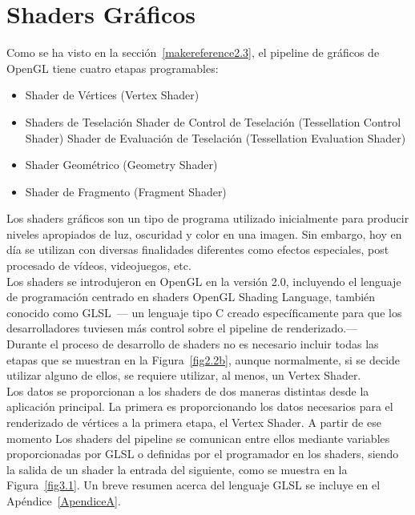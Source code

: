 \cleardoublepage

\chapter{Shaders Gráficos}
\label{makereference3}

Como se ha visto en la sección~\ref{makereference2.3}, el pipeline de gráficos
de OpenGL tiene cuatro etapas programables:

\begin{itemize}
		\item Shader de Vértices (Vertex Shader)
		\item Shaders de Teselación
				\subitem Shader de Control de Teselación (Tessellation Control
				Shader)
				\subitem Shader de Evaluación de Teselación (Tessellation
				Evaluation Shader)
		\item Shader Geométrico (Geometry Shader)
		\item Shader de Fragmento (Fragment Shader)
\end{itemize}

Los shaders gráficos son un tipo de programa utilizado inicialmente para
producir niveles apropiados de luz, oscuridad y color en una imagen. Sin
embargo, hoy en día se utilizan con diversas finalidades diferentes como efectos
especiales, post procesado de vídeos, videojuegos, etc.\\

Los shaders se introdujeron en OpenGL en la versión 2.0, incluyendo el lenguaje
de programación centrado en shaders OpenGL Shading Language, también conocido
como GLSL~\cite{GLSL}--- un lenguaje tipo C creado específicamente para que los
desarrolladores tuviesen más control sobre el pipeline de renderizado.---\\

Durante el proceso de desarrollo de shaders no es necesario incluir todas las
etapas que se muestran en la Figura~\ref{fig2.2b}, aunque normalmente, si se
decide utilizar alguno de ellos, se requiere utilizar, al menos, un Vertex
Shader. \\

Los datos se proporcionan a los shaders de dos maneras distintas desde la
aplicación principal. La primera es proporcionando los datos necesarios para el
renderizado de vértices a la primera etapa, el Vertex Shader. A partir de ese
momento Los shaders del pipeline se comunican entre ellos mediante variables
proporcionadas por GLSL o definidas por el programador en los shaders, siendo la
salida de un shader la entrada del siguiente, como se muestra en la
Figura~\ref{fig3.1}. Un breve resumen acerca del lenguaje GLSL se incluye en el
Apéndice~\ref{ApendiceA}. \\

